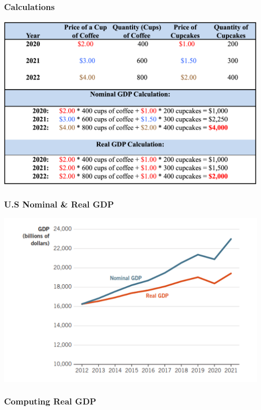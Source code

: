 \documentclass[12pt]{article} %
\begin{document}
\subsubsection*{Calculations}
\begin{center}
\includegraphics[scale=0.5]{../images/Picture10.png}
\end{center} 

\subsubsection*{U.S Nominal \& Real GDP}
\begin{center}
\includegraphics[scale=0.5]{../images/Picture9.png} 
\end{center}

\subsubsection*{Computing Real GDP}
\end{document}
